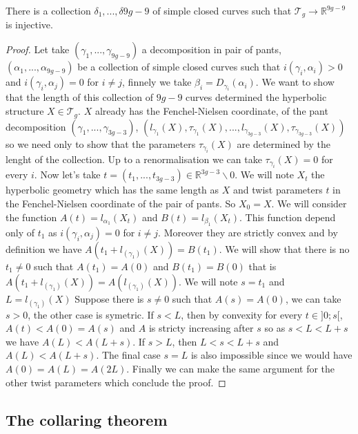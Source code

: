 \begin{thm}
There is a collection $\delta_{1},...,\delta{9g-9}$ of simple closed curves such that $\mathcal{T}_{g} \to \mathbb{R}^{9g-9}$ is injective.
\end{thm}
\begin{proof}
Let take $(\gamma_1,...,\gamma_{9g-9})$ a decomposition in pair of pants, $(\alpha_1,...,\alpha_{9g-9})$ be a collection of simple closed curves such that $i(\gamma_i,\alpha_i) > 0$ and $i(\gamma_i,\alpha_j)=0$ for $i \neq j$, finnely we take $\beta_i=D_{\gamma_i}(\alpha_i)$. We want to show that the length of this collection of $9g-9$ curves determined the hyperbolic structure $X \in \mathcal{T}_g$.
$X$ already has the Fenchel-Nielsen coordinate, of the pant decomposition $(\gamma_1,...,\gamma_{3g-3})$, $(l_{\gamma_1}(X),\tau_{\gamma_1}(X),...,l_{\gamma_{3g-3}}(X),\tau_{\gamma_{3g-3}}(X))$ so we need only to show that the parameters $\tau_{\gamma_i}(X)$ are determined by the lenght of the collection. Up to a renormalisation we can take $\tau_{\gamma_i}(X)=0$ for every $i$. Now let's take $t=(t_1,...,t_{3g-3}) \in \mathbb{R}^{3g-3} \backslash 0$.
We will note $X_t$ the hyperbolic geometry which has the same length as $X$ and twist parameters $t$ in the Fenchel-Nielsen coordinate of the pair of pants. So $X_0 = X$. We will consider the function $A(t)=l_{\alpha_1}(X_t)$ and $B(t)=l_{\beta_1}(X_t)$. This function depend only of $t_1$ as $i(\gamma_i,\alpha_j)=0$ for $i \neq j$. Moreover they are strictly convex and by definition we have $A(t_1+l_(\gamma_1)(X))= B(t_1)$. We will show that there is no $t_1 \neq 0$ such that $A(t_1)=A(0)$ and $B(t_1)=B(0)$ that is $A(t_1+l_(\gamma_1)(X))=A(l_(\gamma_1)(X))$. We will note $s=t_1$ and $L=l_(\gamma_1)(X)$
Suppose there is $s \neq 0$ such that $A(s)=A(0)$, we can take $s > 0$, the other case is symetric. If $s < L$, then by convexity for every $t \in ]0;s[$, $A(t) < A(0)=A(s)$ and $A$ is stricty increasing after $s$ so as $s < L < L+s$ we have $A(L)< A(L+s)$.
If $s > L$, then $L < s < L+s$ and  $A(L) < A(L+s)$. The final case $s=L$ is also impossible since we would have $A(0)=A(L)=A(2L)$.
Finally we can make the same argument for the other twist parameters which conclude the proof.
\end{proof}

\subsection{The collaring theorem}

